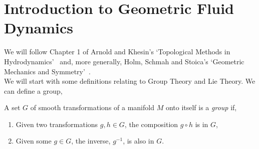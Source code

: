 
\section{Introduction to Geometric Fluid Dynamics}
We will follow Chapter 1 of Arnold and Khesin's `Topological Methods in Hydrodynamics'~\cite{tmih} and, more generally, Holm, Schmah and Stoica's `Geometric Mechanics and Symmetry'~\cite{holm}.\\

\noindent
We will start with some definitions relating to Group Theory and Lie Theory. We can define a group,
\begin{ndefi}
  \label{def:grp}
  A set $G$ of smooth transformations of a manifold $M$ onto itself is a \textit{group} if,
  \begin{enumerate}
    \item Given two transformations $g, h \in G$, the composition $g \circ h$ is in $G$,
    \item Given some $g \in G$, the inverse, $g^{-1}$, is also in $G$.
  \end{enumerate}
\end{ndefi}

